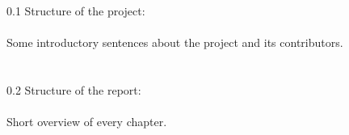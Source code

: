 0.1 Structure of the project: \\
\\
Some introductory sentences about the project and its contributors. \\
\\
\\
0.2 Structure of the report: \\
\\
Short overview of every chapter.